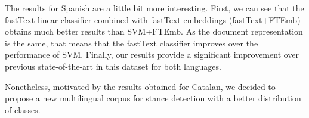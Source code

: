 \documentclass[10pt, a4paper]{article}
\begin{document}
The results for Spanish are a little bit more interesting. First, we can see that the fastText linear classifier combined with fastText embeddings (fastText+FTEmb) obtains much better results than SVM+FTEmb. As the document representation is the same, that means that the fastText classifier \cite{joulin-etal-2017-bag} improves over the performance of SVM. Finally, our results provide a significant improvement over previous state-of-the-art in this dataset for both languages.

Nonetheless, motivated by the results obtained for Catalan, we decided to propose a new multilingual corpus for stance detection with a better distribution of classes.



\end{document}
